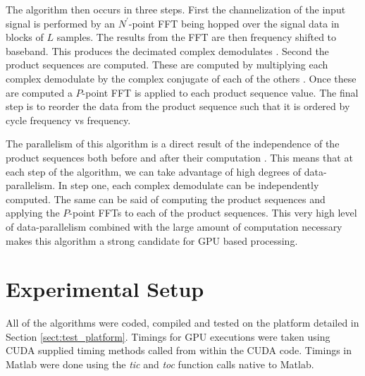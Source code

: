 The algorithm then occurs in three steps.  First the channelization of the input signal is performed by an $N^\prime$-point FFT being hopped over the signal data in blocks of $L$ samples.  The results from the FFT are then frequency shifted to baseband.  This produces the decimated complex demodulates \cite{RobBroLoo91}.  Second the product sequences are computed.  These are computed by multiplying each complex demodulate by the complex conjugate of each of the others \cite{Costa96}.  Once these are computed a $P$-point FFT is applied to each product sequence value.  The final step is to reorder the data from the product sequence such that it is ordered by cycle frequency vs frequency.

The parallelism of this algorithm is a direct result of the independence of the product sequences both before and after their computation \cite{RobBroLoo91}.  This means that at each step of the algorithm, we can take advantage of high degrees of data-parallelism.  In step one, each complex demodulate can be independently computed.  The same can be said of computing the product sequences and applying the $P$-point FFTs to each of the product sequences.  This very high level of data-parallelism combined with the large amount of computation necessary makes this algorithm a strong candidate for GPU based processing.


\section{Experimental Setup}
\label{sect:gpu_experiment}
All of the algorithms were coded, compiled and tested on the platform detailed in Section \ref{sect:test_platform}.  Timings for GPU executions were taken using CUDA supplied timing methods called from within the CUDA code.  Timings in Matlab were done using the \textit{tic} and \textit{toc} function calls native to Matlab.

